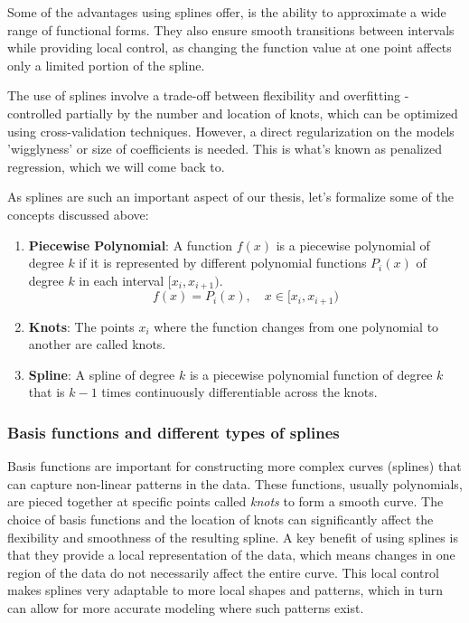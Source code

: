 \documentclass[12pt, twoside,hidelinks]{article}
\theoremstyle{definition}
\numberwithin{equation}{section}
\begin{document}
Some of the advantages using splines offer, is the ability to approximate a wide range of functional forms. They also ensure smooth transitions between intervals while providing local control, as changing the function value at one point affects only a limited portion of the spline.

The use of splines involve a trade-off between flexibility and overfitting - controlled partially by the number and location of knots, which can be optimized using cross-validation techniques. However, a direct regularization on the models 'wigglyness' or size of coefficients is needed. This is what's known as penalized regression, which we will come back to.
\newline

As splines are such an important aspect of our thesis, let's formalize some of the concepts discussed above:

\begin{enumerate}
    \item \textbf{Piecewise Polynomial}: A function \( f(x) \) is a piecewise polynomial of degree \( k \) if it is represented by different polynomial functions \( P_i(x) \) of degree \( k \) in each interval \( [x_{i}, x_{i+1}) \).
    \begin{equation}
         f(x) = P_i(x), \quad x \in [x_{i}, x_{i+1})
         \label{piecewise_poly_spline}
    \end{equation}
    
    \item \textbf{Knots}: The points \( x_i \) where the function changes from one polynomial to another are called knots.
    
    \item \textbf{Spline}: A spline of degree \( k \) is a piecewise polynomial function of degree \( k \) that is \( k-1 \) times continuously differentiable across the knots.
\end{enumerate}

\subsubsection{Basis functions and different types of splines}\label{sec:smooth:splines:basis}

Basis functions are important for constructing more complex curves (splines) that can capture non-linear patterns in the data. These functions, usually polynomials, are pieced together at specific points called \textit{knots} to form a smooth curve. The choice of basis functions and the location of knots can significantly affect the flexibility and smoothness of the resulting spline. 
A key benefit of using splines is that they provide a local representation of the data, which means changes in one region of the data do not necessarily affect the entire curve. This local control makes splines very adaptable to more local shapes and patterns, which in turn can allow for more accurate modeling where such patterns exist. 
\newline
\end{document}

